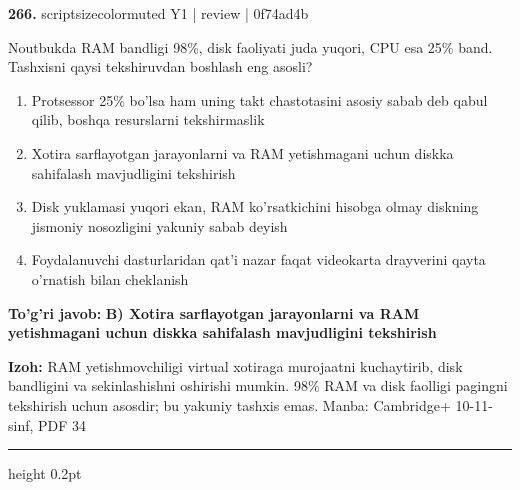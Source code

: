 \documentclass[10pt,a4paper]{article}
\begin{document}
{\bfseries\sffamily\color{ink} 266.} {scriptsizecolor{muted} Y1 | review | 0f74ad4b}
\par
Noutbukda RAM bandligi 98\%, disk faoliyati juda yuqori, CPU esa 25\% band. Tashxisni qaysi tekshiruvdan boshlash eng asosli?
\begin{enumerate}[label=\Alph*),leftmargin=9mm]
\item Protsessor 25\% bo'lsa ham uning takt chastotasini asosiy sabab deb qabul qilib, boshqa resurslarni tekshirmaslik
\item Xotira sarflayotgan jarayonlarni va RAM yetishmagani uchun diskka sahifalash mavjudligini tekshirish
\item Disk yuklamasi yuqori ekan, RAM ko'rsatkichini hisobga olmay diskning jismoniy nosozligini yakuniy sabab deyish
\item Foydalanuvchi dasturlaridan qat'i nazar faqat videokarta drayverini qayta o'rnatish bilan cheklanish
\end{enumerate}
\begin{tcolorbox}[enhanced,breakable,colback=teal!4,colframe=teal!60!black,boxrule=0.45pt,arc=1.2mm,left=2.7mm,right=2.7mm,top=1.8mm,bottom=1.8mm,before skip=2mm,after skip=2mm]
{\bfseries\sffamily\color{teal}To'g'ri javob:} \textbf{B) Xotira sarflayotgan jarayonlarni va RAM yetishmagani uchun diskka sahifalash mavjudligini tekshirish}
\par\smallskip
{\bfseries Izoh:} RAM yetishmovchiligi virtual xotiraga murojaatni kuchaytirib, disk bandligini va sekinlashishni oshirishi mumkin. 98\% RAM va disk faolligi pagingni tekshirish uchun asosdir; bu yakuniy tashxis emas. Manba: Cambridge+ 10-11-sinf, PDF 34
\end{tcolorbox}
\vspace{2mm}\hrule height 0.2pt\vspace{3mm}
\end{document}
